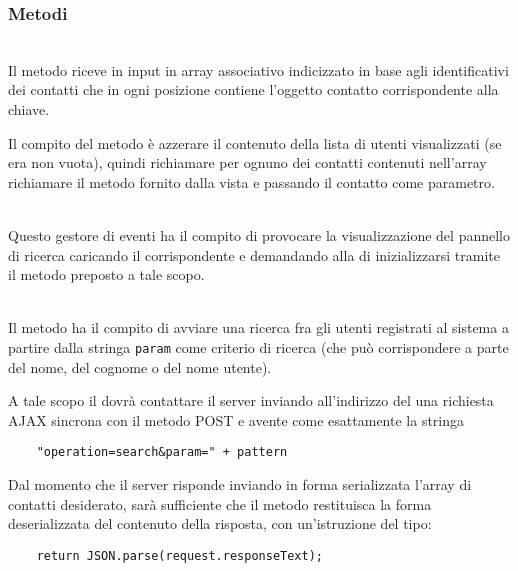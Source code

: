 \subsubsection*{Metodi}
\begin{description}
  
    \item{}\\
  Il metodo riceve in input in array associativo indicizzato in base agli identificativi dei contatti che in ogni posizione contiene l'oggetto contatto corrispondente alla chiave.
  
  Il compito del metodo è azzerare il contenuto della lista di utenti visualizzati (se era non vuota), quindi richiamare per ognuno dei contatti contenuti nell'array richiamare il metodo  fornito dalla vista e passando il contatto come parametro.
  
  \item{}\\
  Questo gestore di eventi ha il compito di provocare la visualizzazione del pannello di ricerca caricando il  corrispondente e demandando alla  di inizializzarsi tramite il metodo  preposto a tale scopo.
  
  \item{}\\
  Il metodo ha il compito di avviare una ricerca fra gli utenti registrati al sistema a partire dalla stringa \verb'param' come criterio di ricerca (che può corrispondere a parte del nome, del cognome o del nome utente).
  
  A tale scopo il  dovrà contattare il server inviando all'indirizzo del una richiesta AJAX sincrona con il metodo POST e avente come  esattamente la stringa
  \begin{verbatim}
    "operation=search&param=" + pattern
  \end{verbatim}
  
  Dal momento che il server risponde inviando in forma serializzata l'array di contatti desiderato, sarà sufficiente che il metodo restituisca la forma deserializzata del contenuto della risposta, con un'istruzione del tipo:
  \begin{verbatim}
    return JSON.parse(request.responseText);
  \end{verbatim}
  
\end{description}



